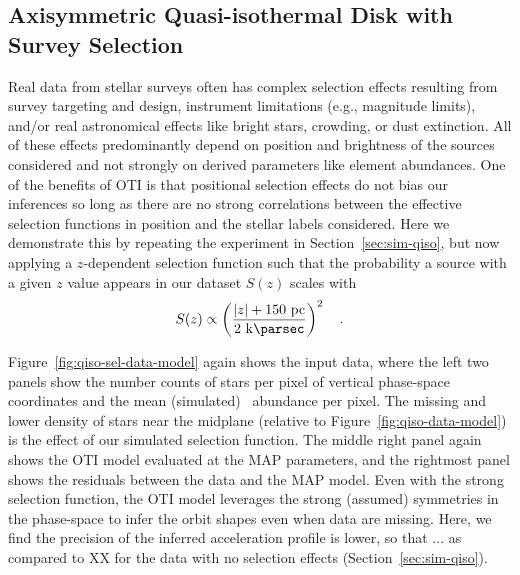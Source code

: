\subsection{Axisymmetric Quasi-isothermal Disk with Survey Selection}
\label{sec:sim-qiso-sel}

Real data from stellar surveys often has complex selection effects resulting from survey
targeting and design, instrument limitations (e.g., magnitude limits), and/or real
astronomical effects like bright stars, crowding, or dust extinction.
All of these effects predominantly depend on position and brightness of the sources
considered and not strongly on derived parameters like element abundances.
One of the benefits of OTI is that positional selection effects do not bias our
inferences so long as there are no strong correlations between the effective selection
functions in position and the stellar labels considered.
Here we demonstrate this by repeating the experiment in Section~\ref{sec:sim-qiso}, but
now applying a $z$-dependent selection function such that the probability a source with
a given $z$ value appears in our dataset $S(z)$ scales with
\begin{equation}
    S(z) \propto \left(\frac{|z| + 150~\unit{pc}}{2~\kpc}\right)^2 \quad .
\end{equation}

Figure~\ref{fig:qiso-sel-data-model} again shows the input data, where the left two
panels show the number counts of stars per pixel of vertical phase-space coordinates and
the mean (simulated) \mgfe\ abundance per pixel.
The missing and lower density of stars near the midplane (relative to
Figure~\ref{fig:qiso-data-model}) is the effect of our simulated selection function.
The middle right panel again shows the OTI model evaluated at the MAP parameters, and
the rightmost panel shows the residuals between the data and the MAP model.
Even with the strong selection function, the OTI model leverages the strong (assumed)
symmetries in the phase-space to infer the orbit shapes even when data are missing.
Here, we find the precision of the inferred acceleration profile is lower, so that ...
 as compared to XX for the data with no
selection effects (Section~\ref{sec:sim-qiso}).


